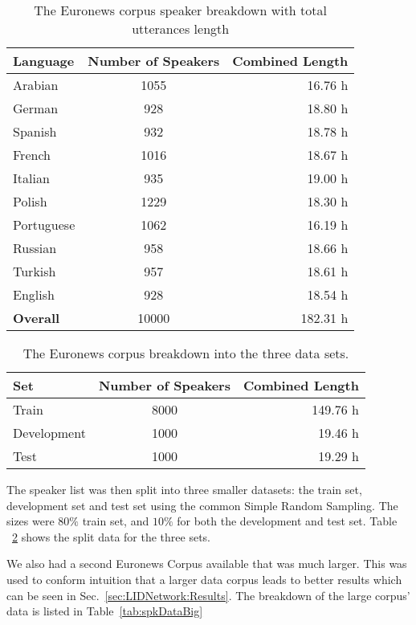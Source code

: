 \begin{table}[h!]
\label{tab:spkData}
\centering
\begin{tabular}{| l | c | r | }
	\hline
	\textbf{Language} & \textbf{Number of Speakers} & \textbf{Combined Length} \\
	\hline
	Arabian & 1055 & 16.76 h \\
	German & 928 & 18.80 h \\
	Spanish & 932 & 18.78 h \\
	French & 1016 & 18.67 h \\  
	Italian & 935 & 19.00 h \\  
	Polish & 1229 & 18.30 h \\ 
	Portuguese & 1062 & 16.19 h \\ 
	Russian & 958 & 18.66 h \\ 
	Turkish & 957 & 18.61 h \\  
	English & 928 & 18.54 h \\ 
	\hline
	\textbf{Overall} & 10000 & 182.31 h\\
	\hline
	
\end{tabular}
\caption{The Euronews corpus speaker breakdown with total utterances length}
\end{table}

\begin{table}[h!]
\label{tab:spkSplit}
\centering
\begin{tabular}{| l | c | r | }
	\hline
	\textbf{Set} & \textbf{Number of Speakers} & \textbf{Combined Length} \\
	\hline
	Train &  8000 & 149.76 h \\
	Development & 1000 & 19.46 h \\
	Test & 1000 & 19.29 h \\
	\hline
\end{tabular}
\caption{The Euronews corpus breakdown into the three data sets.}
\end{table}

The speaker list was then split into three smaller datasets: the train set, development set and test set using the common Simple Random Sampling. The sizes were \(80\%\) train set, and \(10\%\) for both the development and test set. Table ~\ref{tab:spkSplit} shows the split data for the three sets. 

We also had a second Euronews Corpus available that was much larger. This was used to conform intuition that a larger data corpus leads to better results which can be seen in Sec.~\ref{sec:LIDNetwork:Results}. The breakdown of the large corpus' data is listed in Table~\ref{tab:spkDataBig}

